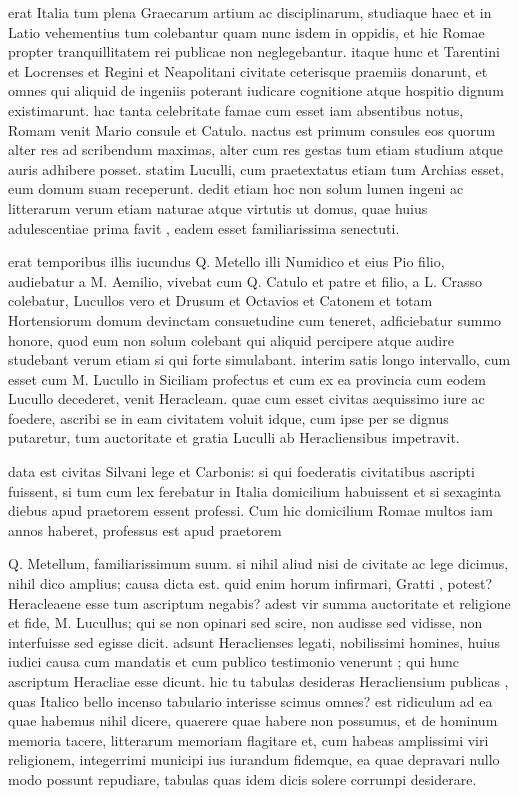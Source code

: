  erat Italia tum plena Graecarum artium ac disciplinarum, studiaque haec et in Latio vehementius tum colebantur quam nunc isdem in oppidis, et hic Romae propter tranquillitatem rei publicae non neglegebantur. itaque hunc et Tarentini et Locrenses et Regini et Neapolitani civitate ceterisque praemiis donarunt, et omnes qui aliquid de ingeniis poterant iudicare cognitione atque hospitio dignum existimarunt. hac tanta celebritate famae cum esset iam absentibus notus, Romam venit Mario consule et Catulo. nactus est primum consules eos quorum alter res ad scribendum maximas, alter cum res gestas tum etiam studium atque auris adhibere posset. statim Luculli, cum praetextatus etiam tum Archias esset, eum domum suam receperunt. dedit etiam hoc non solum lumen ingeni ac litterarum verum etiam naturae atque virtutis ut domus, quae huius adulescentiae prima favit , eadem esset familiarissima senectuti.

 erat temporibus illis iucundus Q. Metello illi Numidico et eius Pio filio, audiebatur a M. Aemilio, vivebat cum Q. Catulo et patre et filio, a L. Crasso colebatur, Lucullos vero et Drusum et Octavios et Catonem et totam Hortensiorum domum devinctam consuetudine cum teneret, adficiebatur summo honore, quod eum non solum colebant qui aliquid percipere atque audire studebant verum etiam si qui forte simulabant. interim satis longo intervallo, cum esset cum M. Lucullo in Siciliam profectus et cum ex ea provincia cum eodem Lucullo decederet, venit Heracleam. quae cum esset civitas aequissimo iure ac foedere, ascribi se in eam civitatem voluit idque, cum ipse per se dignus putaretur, tum auctoritate et gratia Luculli ab Heracliensibus impetravit.

 data est civitas Silvani lege et Carbonis: si qui foederatis civitatibus ascripti fuissent, si tum cum lex ferebatur in Italia domicilium habuissent et si sexaginta diebus apud praetorem essent professi. Cum hic domicilium Romae multos iam annos haberet, professus est apud praetorem

 Q. Metellum, familiarissimum suum. si nihil aliud nisi de civitate ac lege dicimus, nihil dico amplius; causa dicta est. quid enim horum infirmari, Gratti , potest? Heracleaene esse tum ascriptum negabis? adest vir summa auctoritate et religione et fide, M. Lucullus; qui se non opinari sed scire, non audisse sed vidisse, non interfuisse sed egisse dicit. adsunt Heraclienses legati, nobilissimi homines, huius iudici causa cum mandatis et cum publico testimonio venerunt ; qui hunc ascriptum Heracliae esse dicunt. hic tu tabulas desideras Heracliensium publicas , quas Italico bello incenso tabulario interisse scimus omnes? est ridiculum ad ea quae habemus nihil dicere, quaerere quae habere non possumus, et de hominum memoria tacere, litterarum memoriam flagitare et, cum habeas amplissimi viri religionem, integerrimi municipi ius iurandum fidemque, ea quae depravari nullo modo possunt repudiare, tabulas quas idem dicis solere corrumpi desiderare.

